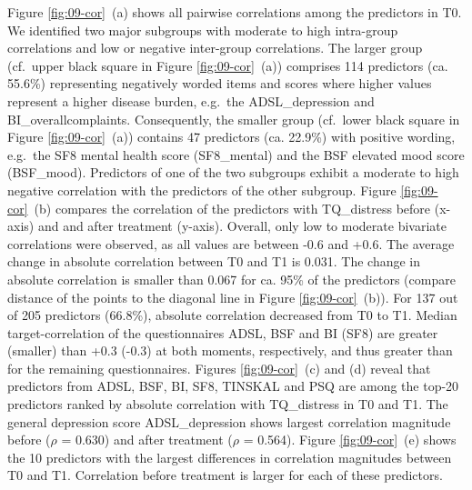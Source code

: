 \documentclass[
  oneside]{book}
\begin{document}
Figure \ref{fig:09-cor}~(a) shows all pairwise correlations among the predictors in T0.
We identified two major subgroups with moderate to high intra-group correlations and low or negative inter-group correlations.
The larger group (cf.~upper black square in Figure \ref{fig:09-cor}~(a)) comprises 114 predictors (ca. 55.6\%) representing negatively worded items and scores where higher values represent a higher disease burden, e.g.~the ADSL\_depression and BI\_overallcomplaints.
Consequently, the smaller group (cf.~lower black square in Figure \ref{fig:09-cor}~(a)) contains 47 predictors (ca. 22.9\%) with positive wording, e.g.~the SF8 mental health score (SF8\_mental) and the BSF elevated mood score (BSF\_mood).
Predictors of one of the two subgroups exhibit a moderate to high negative correlation with the predictors of the other subgroup.
Figure \ref{fig:09-cor}~(b) compares the correlation of the predictors with TQ\_distress before (x-axis) and and after treatment (y-axis).
Overall, only low to moderate bivariate correlations were observed, as all values are between -0.6 and +0.6.
The average change in absolute correlation between T0 and T1 is 0.031.
The change in absolute correlation is smaller than 0.067 for ca. 95\% of the predictors (compare distance of the points to the diagonal line in Figure \ref{fig:09-cor}~(b)).
For 137 out of 205 predictors (66.8\%), absolute correlation decreased from T0 to T1.
Median target-correlation of the questionnaires ADSL, BSF and BI (SF8) are greater (smaller) than +0.3 (-0.3) at both moments, respectively, and thus greater than for the remaining questionnaires.
Figures \ref{fig:09-cor}~(c) and (d) reveal that predictors from ADSL, BSF, BI, SF8, TINSKAL and PSQ are among the top-20 predictors ranked by absolute correlation with TQ\_distress in T0 and T1.
The general depression score ADSL\_depression shows largest correlation magnitude before (\(\rho\) = 0.630) and after treatment (\(\rho\) = 0.564).
Figure \ref{fig:09-cor}~(e) shows the 10 predictors with the largest differences in correlation magnitudes between T0 and T1.
Correlation before treatment is larger for each of these predictors.
\end{document}
